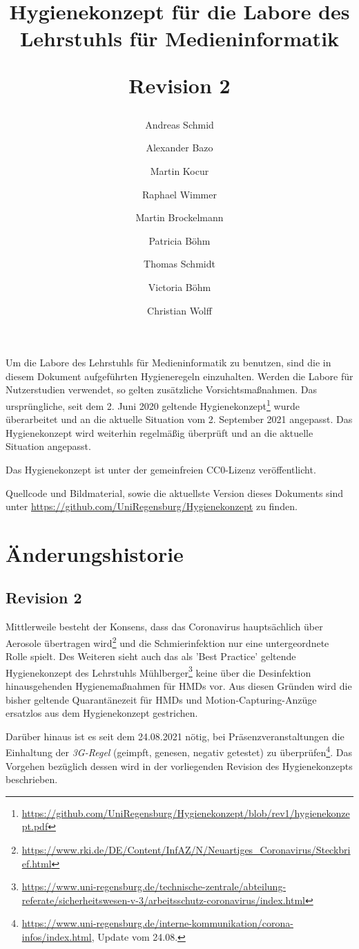 \documentclass[hidelinks,12pt]{extarticle}
\title{
    \bfseries
    \sffamily
    Hygienekonzept für die Labore des Lehrstuhls für Medieninformatik

    \medskip
    \large{Revision 2}
}
\author{Andreas Schmid}
\author{Alexander Bazo}
\author{Martin Kocur}
\author{Raphael Wimmer}
\author{Martin Brockelmann}
\author{Patricia Böhm}
\author{Thomas Schmidt}
\author{Victoria Böhm}
\author{Christian Wolff}
\affil{Lehrstuhl für Medieninformatik, Universität Regensburg}
\begin{document}
\onehalfspacing
\maketitle

\noindent
Um die Labore des Lehrstuhls für Medieninformatik zu benutzen, sind die in diesem Dokument aufgeführten Hygieneregeln einzuhalten.
Werden die Labore für Nutzerstudien verwendet, so gelten zusätzliche Vorsichtsmaßnahmen.
Das ursprüngliche, seit dem 2. Juni 2020 geltende Hygienekonzept\footnote{\url{https://github.com/UniRegensburg/Hygienekonzept/blob/rev1/hygienekonzept.pdf}} wurde überarbeitet und an die aktuelle Situation vom 2. September 2021 angepasst.
Das Hygienekonzept wird weiterhin regelmäßig überprüft und an die aktuelle Situation angepasst.

\medskip
\noindent
Das Hygienekonzept ist unter der gemeinfreien CC0-Lizenz veröffentlicht.

\noindent
Quellcode und Bildmaterial, sowie die aktuellste Version dieses Dokuments sind unter \url{https://github.com/UniRegensburg/Hygienekonzept} zu finden.

\newpage

\section*{Änderungshistorie}\label{app:changelog}

\subsection*{Revision 2}

Mittlerweile besteht der Konsens, dass das Coronavirus hauptsächlich über Aerosole übertragen wird\footnote{\url{https://www.rki.de/DE/Content/InfAZ/N/Neuartiges_Coronavirus/Steckbrief.html}} und die Schmierinfektion nur eine untergeordnete Rolle spielt.
Des Weiteren sieht auch das als 'Best Practice' geltende Hygienekonzept des Lehrstuhls Mühlberger\footnote{\url{ https://www.uni-regensburg.de/technische-zentrale/abteilung-referate/sicherheitswesen-v-3/arbeitsschutz-coronavirus/index.html}} keine über die Desinfektion hinausgehenden Hygienemaßnahmen für HMDs vor.
Aus diesen Gründen wird die bisher geltende Quarantänezeit für HMDs und Motion-Capturing-Anzüge ersatzlos aus dem Hygienekonzept gestrichen.

Darüber hinaus ist es seit dem 24.08.2021 nötig, bei Präsenzveranstaltungen die Einhaltung der \emph{3G-Regel} (geimpft, genesen, negativ getestet) zu überprüfen\footnote{\url{https://www.uni-regensburg.de/interne-kommunikation/corona-infos/index.html}, Update vom 24.08.}.
Das Vorgehen bezüglich dessen wird in der vorliegenden Revision des Hygienekonzepts beschrieben.
\end{document}
